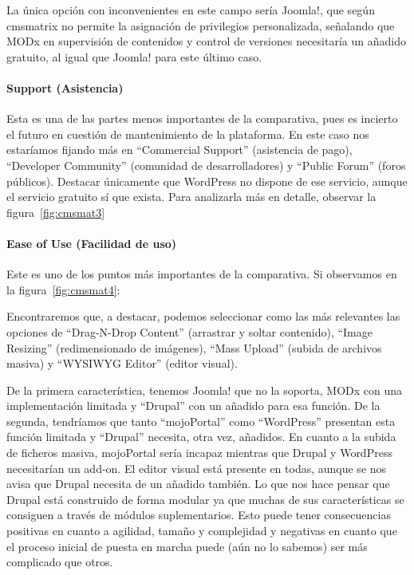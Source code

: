 \par La única opción con inconvenientes en este campo sería Joomla!, que según cmsmatrix no permite la asignación de privilegios personalizada, señalando que MODx en supervisión de contenidos y control de versiones necesitaría un añadido gratuito, al igual que Joomla! para este último caso.


\paragraph{Support (Asistencia)}

\par Esta es una de las partes menos importantes de la comparativa, pues es incierto el futuro en cuestión de mantenimiento de la plataforma. En este caso nos estaríamos fijando más en ``Commercial Support'' (asistencia de pago), ``Developer Community'' (comunidad de desarrolladores) y ``Public Forum'' (foros públicos). Destacar únicamente que WordPress no dispone de ese servicio, aunque el servicio gratuito sí que exista. Para analizarla más en detalle, observar la figura~\ref{fig:cmsmat3}


\paragraph{Ease of Use (Facilidad de uso)}

\par Este es uno de los puntos más importantes de la comparativa. Si observamos en la figura~\ref{fig:cmsmat4}:


\par Encontraremos que, a destacar, podemos seleccionar como las más relevantes las opciones de ``Drag-N-Drop Content'' (arrastrar y soltar contenido), ``Image Resizing'' (redimensionado de imágenes), ``Mass Upload'' (subida de archivos masiva) y ``WYSIWYG Editor'' (editor visual).
\par De la primera característica, tenemos Joomla! que no la soporta, MODx con una implementación limitada y ``Drupal'' con un añadido para esa función. De la segunda, tendríamos que tanto ``mojoPortal'' como ``WordPress'' presentan esta función limitada y ``Drupal'' necesita, otra vez, añadidos. En cuanto a la subida de ficheros masiva, mojoPortal sería incapaz mientras que Drupal y WordPress necesitarían un add-on. El editor visual está presente en todas, aunque se nos avisa que Drupal necesita de un añadido también. Lo que nos hace pensar que Drupal está construido de forma modular ya que muchas de sus características se consiguen a través de módulos suplementarios. Esto puede tener consecuencias positivas en cuanto a agilidad, tamaño y complejidad y negativas en cuanto que el proceso inicial de puesta en marcha puede (aún no lo sabemos) ser más complicado que otros.



